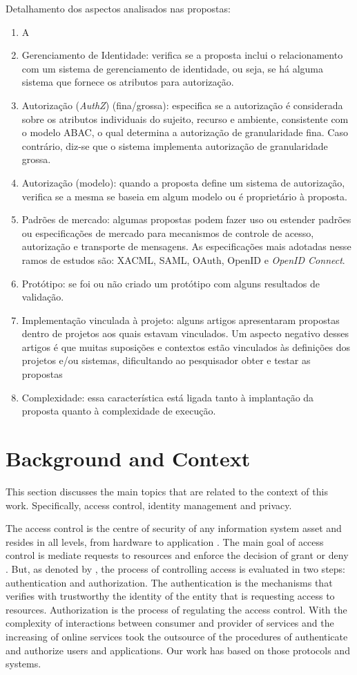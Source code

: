 \documentclass{doublecol-new}
\begin{document}
Detalhamento dos aspectos analisados nas propostas:
\begin{enumerate}
	\item A
	\item Gerenciamento de Identidade: verifica se a proposta inclui o relacionamento com um sistema de gerenciamento de identidade, ou seja, se há alguma sistema que fornece os atributos para autorização.
	\item Autorização (\textit{AuthZ}) (fina/grossa): especifica se a autorização é considerada sobre os atributos individuais do sujeito, recurso e ambiente, consistente com o modelo ABAC, o qual determina a autorização de granularidade fina. Caso contrário, diz-se que o sistema implementa autorização de granularidade grossa.
	\item Autorização (modelo): quando a proposta define um sistema de autorização, verifica se a mesma se baseia em algum modelo ou é proprietário à proposta.
	\item Padrões de mercado: algumas propostas podem fazer uso ou estender padrões ou especificações de mercado para mecanismos de controle de acesso, autorização e transporte de mensagens. As especificações mais adotadas nesse ramos de estudos são: XACML, SAML, OAuth, OpenID e \textit{OpenID Connect}.
	\item Protótipo: se foi ou não criado um protótipo com alguns resultados de validação.
	\item Implementação vinculada à projeto: alguns artigos apresentaram propostas dentro de projetos aos quais estavam vinculados. Um aspecto negativo desses artigos é que muitas suposições e contextos estão vinculados às definições dos projetos e/ou sistemas, dificultando ao pesquisador obter e testar as propostas
	\item Complexidade: essa característica está ligada tanto à implantação da proposta quanto à complexidade de execução.	
\end{enumerate}


\section{Background and Context}
This section discusses the main topics that are related to the context of this work. Specifically, access control, identity management and privacy.

The access control is the centre of security of any information system asset and resides in all levels, from hardware to application \citep{anderson2008security}. The main goal of access control is mediate requests to resources and enforce the decision of grant or deny \citep{samarati2001access}. But, as denoted by \cite{gollmann2011compsecurity}, the process of controlling access is evaluated in two steps: authentication and authorization. The authentication is the mechanisms that verifies with trustworthy the identity of the entity that is requesting access to resources. Authorization is the process of regulating the access control. With the complexity of interactions between consumer and provider of services and the increasing of online services took the outsource of the procedures of authenticate and authorize users and applications. Our work has based on those protocols and systems.
\end{document}
